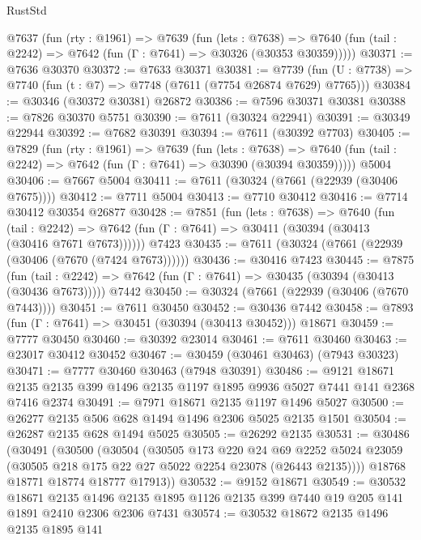 \begin{lexlean}{RustStd}
\begin{coremodule}
{\begin{coremodule}
{{{{{{{{{{{{{{{{{{{{{{{{{{{{{{{{{{  @7637
    (fun (rty : @1961) =>
    @7639
      (fun (lets : @7638) =>
      @7640 (fun (tail : @2242) => @7642 (fun (Γ : @7641) => @30326 (@30353 @30359)))))
@30371 := @7636 @30370
@30372 := @7633 @30371
@30381 := @7739
    (fun (U : @7738) => @7740 (fun (t : @7) => @7748 (@7611 (@7754 @26874 @7629) @7765)))
@30384 := @30346 (@30372 @30381) @26872
@30386 := @7596 @30371 @30381
@30388 := @7826 @30370 @5751
@30390 := @7611 (@30324 @22941)
@30391 := @30349 @22944
@30392 := @7682 @30391
@30394 := @7611 (@30392 @7703)
@30405 := @7829
    (fun (rty : @1961) =>
    @7639
      (fun (lets : @7638) =>
      @7640 (fun (tail : @2242) => @7642 (fun (Γ : @7641) => @30390 (@30394 @30359)))))
    @5004
@30406 := @7667 @5004
@30411 := @7611 (@30324 (@7661 (@22939 (@30406 @7675))))
@30412 := @7711 @5004
@30413 := @7710 @30412
@30416 := @7714 @30412 @30354 @26877
@30428 := @7851
    (fun (lets : @7638) =>
    @7640
      (fun (tail : @2242) =>
      @7642 (fun (Γ : @7641) => @30411 (@30394 (@30413 (@30416 @7671 @7673))))))
    @7423
@30435 := @7611 (@30324 (@7661 (@22939 (@30406 (@7670 (@7424 @7673))))))
@30436 := @30416 @7423
@30445 := @7875
    (fun (tail : @2242) => @7642 (fun (Γ : @7641) => @30435 (@30394 (@30413 (@30436 @7673)))))
    @7442
@30450 := @30324 (@7661 (@22939 (@30406 (@7670 @7443))))
@30451 := @7611 @30450
@30452 := @30436 @7442
@30458 := @7893 (fun (Γ : @7641) => @30451 (@30394 (@30413 @30452))) @18671
@30459 := @7777 @30450
@30460 := @30392 @23014
@30461 := @7611 @30460
@30463 := @23017 @30412 @30452
@30467 := @30459 (@30461 @30463) (@7943 @30323)
@30471 := @7777 @30460 @30463 (@7948 @30391)
@30486 := @9121
    @18671
    @2135
    @2135
    @399
    @1496
    @2135
    @1197
    @1895
    @9936
    @5027
    @7441
    @141
    @2368
    @7416
    @2374
@30491 := @7971 @18671 @2135 @1197 @1496 @5027
@30500 := @26277 @2135 @506 @628 @1494 @1496 @2306 @5025 @2135 @1501
@30504 := @26287 @2135 @628 @1494 @5025
@30505 := @26292 @2135
@30531 := @30486
    (@30491
      (@30500
        (@30504
          (@30505
            @173
            @220
            @24
            @69
            @2252
            @5024
            @23059
            (@30505 @218 @175 @22 @27 @5022 @2254 @23078 (@26443 @2135))))
        @18768
        @18771
        @18774
        @18777
        @17913))
@30532 := @9152 @18671
@30549 := @30532
    @18671
    @2135
    @1496
    @2135
    @1895
    @1126
    @2135
    @399
    @7440
    @19
    @205
    @141
    @1891
    @2410
    @2306
    @2306
    @7431
@30574 := @30532
    @18672
    @2135
    @1496
    @2135
    @1895
    @141
}}}}}}}}}}}}}}}}}}}}}}}}}}}}}}}}}}
\end{coremodule}}
\end{coremodule}
\end{lexlean}
